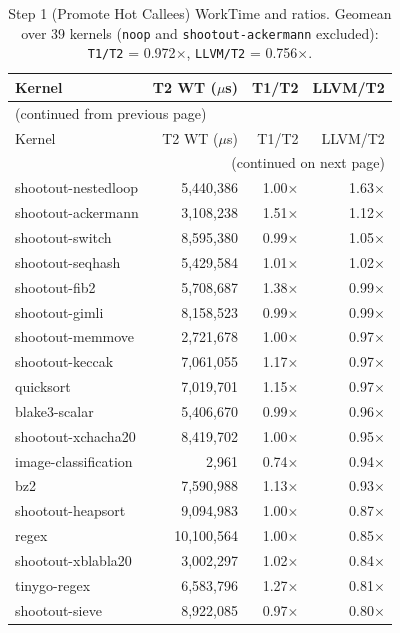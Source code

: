 \begin{longtable}{l r r r}
\caption{Step 1 (Promote Hot Callees) WorkTime and ratios. Geomean over 39 kernels (\texttt{noop} and \texttt{shootout-ackermann} excluded): \texttt{T1/T2} = 0.972$\times$, \texttt{LLVM/T2} = 0.756$\times$.}
\label{tbl:appB:step1:wt}\\
\toprule
Kernel & T2 WT ($\mu$s) & T1/T2 & LLVM/T2 \\
\midrule
\endfirsthead
\multicolumn{4}{l}{\small (continued from previous page)} \\
\toprule
Kernel & T2 WT ($\mu$s) & T1/T2 & LLVM/T2 \\
\midrule
\endhead
\midrule
\multicolumn{4}{r}{\small (continued on next page)} \\
\endfoot
\bottomrule
\endlastfoot
shootout-nestedloop & 5{,}440{,}386 & 1.00$\times$ & 1.63$\times$ \\
shootout-ackermann & 3{,}108{,}238 & 1.51$\times$ & 1.12$\times$ \\
shootout-switch & 8{,}595{,}380 & 0.99$\times$ & 1.05$\times$ \\
shootout-seqhash & 5{,}429{,}584 & 1.01$\times$ & 1.02$\times$ \\
shootout-fib2 & 5{,}708{,}687 & 1.38$\times$ & 0.99$\times$ \\
shootout-gimli & 8{,}158{,}523 & 0.99$\times$ & 0.99$\times$ \\
shootout-memmove & 2{,}721{,}678 & 1.00$\times$ & 0.97$\times$ \\
shootout-keccak & 7{,}061{,}055 & 1.17$\times$ & 0.97$\times$ \\
quicksort & 7{,}019{,}701 & 1.15$\times$ & 0.97$\times$ \\
blake3-scalar & 5{,}406{,}670 & 0.99$\times$ & 0.96$\times$ \\
shootout-xchacha20 & 8{,}419{,}702 & 1.00$\times$ & 0.95$\times$ \\
image-classification & 2{,}961 & 0.74$\times$ & 0.94$\times$ \\
bz2 & 7{,}590{,}988 & 1.13$\times$ & 0.93$\times$ \\
shootout-heapsort & 9{,}094{,}983 & 1.00$\times$ & 0.87$\times$ \\
regex & 10{,}100{,}564 & 1.00$\times$ & 0.85$\times$ \\
shootout-xblabla20 & 3{,}002{,}297 & 1.02$\times$ & 0.84$\times$ \\
tinygo-regex & 6{,}583{,}796 & 1.27$\times$ & 0.81$\times$ \\
shootout-sieve & 8{,}922{,}085 & 0.97$\times$ & 0.80$\times$ \\

\end{longtable}
